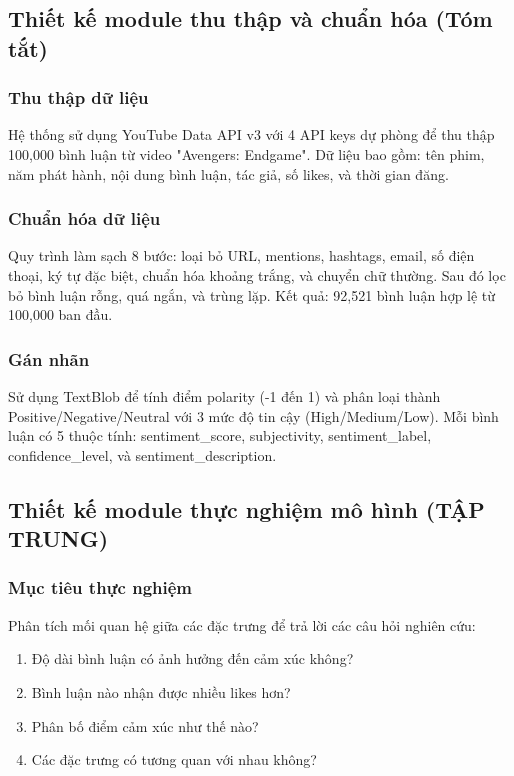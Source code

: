 \subsection{Thiết kế module thu thập và chuẩn hóa (Tóm tắt)}

\subsubsection{Thu thập dữ liệu}
Hệ thống sử dụng YouTube Data API v3 với 4 API keys dự phòng để thu thập 100,000 bình luận từ video "Avengers: Endgame". Dữ liệu bao gồm: tên phim, năm phát hành, nội dung bình luận, tác giả, số likes, và thời gian đăng.

\subsubsection{Chuẩn hóa dữ liệu}
Quy trình làm sạch 8 bước: loại bỏ URL, mentions, hashtags, email, số điện thoại, ký tự đặc biệt, chuẩn hóa khoảng trắng, và chuyển chữ thường. Sau đó lọc bỏ bình luận rỗng, quá ngắn, và trùng lặp. Kết quả: 92,521 bình luận hợp lệ từ 100,000 ban đầu.

\subsubsection{Gán nhãn}
Sử dụng TextBlob để tính điểm polarity (-1 đến 1) và phân loại thành Positive/Negative/Neutral với 3 mức độ tin cậy (High/Medium/Low). Mỗi bình luận có 5 thuộc tính: sentiment\_score, subjectivity, sentiment\_label, confidence\_level, và sentiment\_description.

\subsection{Thiết kế module thực nghiệm mô hình (TẬP TRUNG)}

\subsubsection{Mục tiêu thực nghiệm}
Phân tích mối quan hệ giữa các đặc trưng để trả lời các câu hỏi nghiên cứu:

\begin{enumerate}
    \item Độ dài bình luận có ảnh hưởng đến cảm xúc không?
    \item Bình luận nào nhận được nhiều likes hơn?
    \item Phân bố điểm cảm xúc như thế nào?
    \item Các đặc trưng có tương quan với nhau không?
\end{enumerate}

